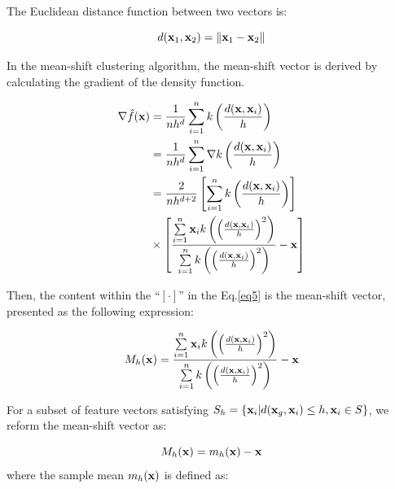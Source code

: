 \documentclass[journal,twoside,web]{ieeecolor}
\begin{document}
The Euclidean distance function between two vectors is:

\begin{equation}
d({{\bf{x}}_1},{{\bf{x}}_2}) = \left\| {{{\bf{x}}_1} - {{\bf{x}}_2}} \right\|
\label{eq4}\end{equation}

In the mean-shift clustering algorithm, the mean-shift vector is derived by calculating the gradient of the density function.

\begin{equation}\label{eq5}
\begin{split}
\nabla \hat f({\bf{x}}) &= \frac{1}{{n{h^d}}}\sum\limits_{i = 1}^n k \left( {\frac{{d({{\bf{x}}},{{\bf{x}}_i})}}{h}} \right) \\
&= \frac{1}{{n{h^d}}}\sum\limits_{i = 1}^n {\nabla k} \left( {\frac{{d({{\bf{x}}},{{\bf{x}}_i})}}{h}} \right) \\
&= \frac{2}{{n{h^{d + 2}}}}\left[ {\sum\limits_{i = 1}^n k \left( {\frac{{d({\bf{x}},{{\bf{x}}_i})}}{h}} \right)} \right] \\ 
&\times \left[ {\frac{{\sum\limits_{i = 1}^n {{{\bf{x}}_i}k} \left( {{{\left( {\frac{{d({\bf{x}},{{\bf{x}}_i})}}{h}} \right)}^2}} \right)}}{{\sum\limits_{i = 1}^n k \left( {{{\left( {\frac{{d({\bf{x}},{{\bf{x}}_i})}}{h}} \right)}^2}} \right)}} - {\bf{x}}} \right] \\
\end{split}
\end{equation}

Then, the content within the ``$[\cdot]$'' in the Eq.\eqref{eq5} is the mean-shift vector, presented as the following expression:

\begin{equation}
{M_h}({\bf{x}}) = \frac{{\sum\limits_{i = 1}^n {{{\bf{x}}_i}k} \left( {{{\left( {\frac{{d({\bf{x}},{{\bf{x}}_i})}}{h}} \right)}^2}} \right)}}{{\sum\limits_{i = 1}^n k \left( {{{\left( {\frac{{d({\bf{x}},{{\bf{x}}_i})}}{h}} \right)}^2}} \right)}} - {\bf{x}}
\label{eq6}\end{equation}

For a subset of feature vectors satisfying $S_h = \{ {{\bf{x}}_i}|d({{\bf{x}}_g},{{\bf{x}}_i}) \le h,{{\bf{x}}_i} \in S\} $, we reform the mean-shift vector as:

\begin{equation}
{M_h}({\bf{x}}) = {m_h}({\bf{x}}) - {\bf{x}}
\label{eq7}\end{equation} where the sample mean ${m_h}({\bf{x}})$ is defined as:
\end{document}
